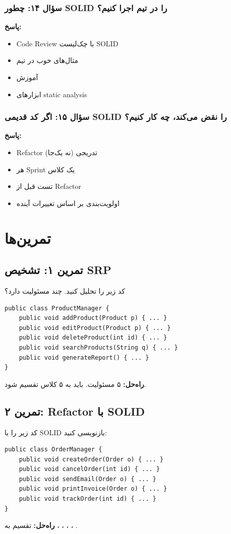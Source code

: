 \documentclass[12pt, a4paper]{article}
\begin{document}
\subsubsection{سؤال ۱۴: چطور SOLID را در تیم اجرا کنیم؟}
\textbf{پاسخ:}
\begin{itemize}
    \item Code Review با چک‌لیست SOLID
    \item مثال‌های خوب در تیم
    \item آموزش
    \item ابزارهای static analysis
\end{itemize}

\subsubsection{سؤال ۱۵: اگر کد قدیمی SOLID را نقض می‌کند، چه کار کنیم؟}
\textbf{پاسخ:}
\begin{itemize}
    \item Refactor تدریجی (نه یک‌جا)
    \item هر Sprint یک کلاس
    \item تست قبل از Refactor
    \item اولویت‌بندی بر اساس تغییرات آینده
\end{itemize}

\section{تمرین‌ها}

\subsection{تمرین ۱: تشخیص SRP}
کد زیر را تحلیل کنید. چند مسئولیت دارد؟
\begin{lstlisting}
public class ProductManager {
    public void addProduct(Product p) { ... }
    public void editProduct(Product p) { ... }
    public void deleteProduct(int id) { ... }
    public void searchProducts(String q) { ... }
    public void generateReport() { ... }
}
\end{lstlisting}
\textbf{راه‌حل:} ۵ مسئولیت. باید به ۵ کلاس تقسیم شود.

\subsection{تمرین ۲: Refactor با SOLID}
کد زیر را با SOLID بازنویسی کنید:
\begin{lstlisting}
public class OrderManager {
    public void createOrder(Order o) { ... }
    public void cancelOrder(int id) { ... }
    public void sendEmail(Order o) { ... }
    public void printInvoice(Order o) { ... }
    public void trackOrder(int id) { ... }
}
\end{lstlisting}
\textbf{راه‌حل:} تقسیم به ، ، 
، ، .
\end{document}

